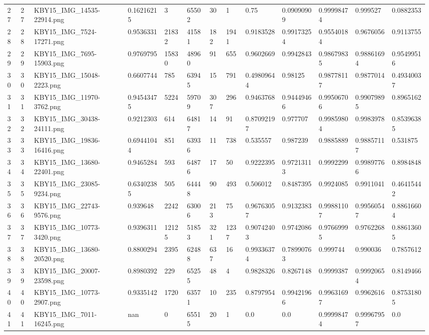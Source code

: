 \documentclass[11pt, a4paper, twoside]{report}
\begin{document}
\begin{longtable}[c]{@{}lllllllllllll@{}}
27 & 27 & KBY15\_IMG\_14535-22914.png & 0.16216215 & 3 & 65502 & 30 & 1 & 0.75 & 0.09090909 & 0.99998474 & 0.999527 & 0.0882353 \\
28 & 28 & KBY15\_IMG\_7524-17271.png & 0.9536331 & 21832 & 41581 & 182 & 1941 & 0.9183528 & 0.99173254 & 0.95540184 & 0.9676056 & 0.9113755 \\
29 & 29 & KBY15\_IMG\_7695-15903.png & 0.9769795 & 15830 & 48960 & 91 & 655 & 0.9602669 & 0.9942843 & 0.98679835 & 0.98861694 & 0.95499516 \\
30 & 30 & KBY15\_IMG\_15048-2223.png & 0.6607744 & 785 & 63945 & 15 & 791 & 0.49809644 & 0.98125 & 0.98778117 & 0.9877014 & 0.49340037 \\
31 & 31 & KBY15\_IMG\_11970-3762.png & 0.94543475 & 5224 & 59709 & 307 & 296 & 0.9463768 & 0.94449466 & 0.99506706 & 0.99079895 & 0.8965162 \\
32 & 32 & KBY15\_IMG\_30438-24111.png & 0.9212303 & 614 & 64817 & 14 & 91 & 0.87092197 & 0.977707 & 0.99859804 & 0.9983978 & 0.85396385 \\
33 & 33 & KBY15\_IMG\_19836-16416.png & 0.69441044 & 851 & 63936 & 11 & 738 & 0.535557 & 0.987239 & 0.9885889 & 0.98857117 & 0.531875 \\
34 & 34 & KBY15\_IMG\_13680-22401.png & 0.9465284 & 593 & 64876 & 17 & 50 & 0.9222395 & 0.97213113 & 0.9992299 & 0.99897766 & 0.8984848 \\
35 & 35 & KBY15\_IMG\_23085-9234.png & 0.63402385 & 505 & 64448 & 90 & 493 & 0.506012 & 0.8487395 & 0.9924085 & 0.9911041 & 0.46415442 \\
36 & 36 & KBY15\_IMG\_22743-9576.png & 0.939648 & 2242 & 63006 & 213 & 75 & 0.96763057 & 0.9132383 & 0.99881107 & 0.99560547 & 0.88616604 \\
37 & 37 & KBY15\_IMG\_10773-3420.png & 0.9396311 & 12125 & 51853 & 321 & 1237 & 0.90742403 & 0.9742086 & 0.97669995 & 0.9762268 & 0.88613605 \\
38 & 38 & KBY15\_IMG\_13680-20520.png & 0.8800294 & 2395 & 62488 & 637 & 16 & 0.99336374 & 0.78990763 & 0.999744 & 0.990036 & 0.7857612 \\
39 & 39 & KBY15\_IMG\_20007-23598.png & 0.8980392 & 229 & 65255 & 48 & 4 & 0.9828326 & 0.8267148 & 0.9999387 & 0.99920654 & 0.8149466 \\
40 & 40 & KBY15\_IMG\_10773-2907.png & 0.9335142 & 1720 & 63571 & 10 & 235 & 0.8797954 & 0.99421966 & 0.99631697 & 0.9962616 & 0.87531805 \\
41 & 41 & KBY15\_IMG\_7011-16245.png & nan & 0 & 65515 & 20 & 1 & 0.0 & 0.0 & 0.99998474 & 0.99967957 & 0.0 \\

\end{longtable}
\end{document}
